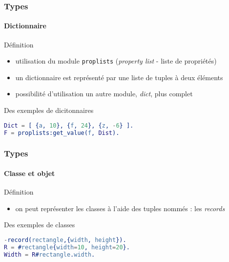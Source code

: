 \begin{frame}[fragile]
  \frametitle{Types}
  \framesubtitle{Dictionnaire}

  \begin{block}{Définition}
    \begin{itemize}
      \item utilisation du module \texttt{proplists} (\textit{property list}
        - liste de propriétés)
      \item un dictionnaire est représenté par une liste de tuples à deux
        éléments
      \item possibilité d'utilisation un autre module, \textit{dict},
        plus complet
    \end{itemize}
  \end{block}

  \begin{exampleblock}{Des exemples de dicitonnaires}
    \begin{lstlisting}[language=erlang]
Dict = [ {a, 10}, {f, 24}, {z, -6} ].
F = proplists:get_value(f, Dist).
    \end{lstlisting}
  \end{exampleblock}

\end{frame}

\begin{frame}[fragile]
  \frametitle{Types}
  \framesubtitle{Classe et objet}

  \begin{block}{Définition}
    \begin{itemize}
      \item on peut représenter les classes à l'aide des tuples nommés :
        les \textit{records}
    \end{itemize}
  \end{block}

  \begin{exampleblock}{Des exemples de classes}
    \begin{lstlisting}[language=erlang]
-record(rectangle,{width, height}).
R = #rectangle{width=10, height=20}.
Width = R#rectangle.width.
    \end{lstlisting}
  \end{exampleblock}

\end{frame}

